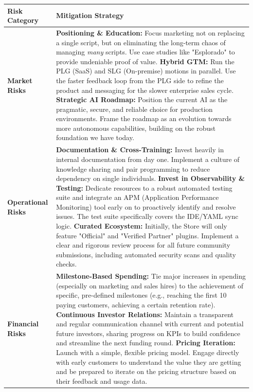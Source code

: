 \documentclass[11pt, a4paper, oneside]{article}
\begin{document}
\begin{table}[H]
\centering
\begin{tabularx}{\textwidth}{@{}lL@{}}
\toprule
\textbf{Risk Category} & \textbf{Mitigation Strategy} \\
\midrule
\textbf{Market Risks} & 
\textbf{Positioning \& Education:} Focus marketing not on replacing a single script, but on eliminating the long-term chaos of managing \textit{many} scripts. Use case studies like "Esplorado" to provide undeniable proof of value. \newline\newline
\textbf{Hybrid GTM:} Run the PLG (SaaS) and SLG (On-premise) motions in parallel. Use the faster feedback loop from the PLG side to refine the product and messaging for the slower enterprise sales cycle. \newline\newline
\textbf{Strategic AI Roadmap:} Position the current AI as the pragmatic, secure, and reliable choice for production environments. Frame the roadmap as an evolution towards more autonomous capabilities, building on the robust foundation we have today. \\
\addlinespace
\textbf{Operational Risks} & 
\textbf{Documentation \& Cross-Training:} Invest heavily in internal documentation from day one. Implement a culture of knowledge sharing and pair programming to reduce dependency on single individuals. \newline\newline
\textbf{Invest in Observability \& Testing:} Dedicate resources to a robust automated testing suite and integrate an APM (Application Performance Monitoring) tool early on to proactively identify and resolve issues. The test suite specifically covers the IDE/YAML sync logic. \newline\newline
\textbf{Curated Ecosystem:} Initially, the Store will only feature "Official" and "Verified Partner" plugins. Implement a clear and rigorous review process for all future community submissions, including automated security scans and quality checks. \\
\addlinespace
\textbf{Financial Risks} & 
\textbf{Milestone-Based Spending:} Tie major increases in spending (especially on marketing and sales hires) to the achievement of specific, pre-defined milestones (e.g., reaching the first 10 paying customers, achieving a certain retention rate). \newline\newline
\textbf{Continuous Investor Relations:} Maintain a transparent and regular communication channel with current and potential future investors, sharing progress on KPIs to build confidence and streamline the next funding round. \newline\newline
\textbf{Pricing Iteration:} Launch with a simple, flexible pricing model. Engage directly with early customers to understand the value they are getting and be prepared to iterate on the pricing structure based on their feedback and usage data. \\
\bottomrule
\end{tabularx}
\end{table}
\end{document}

